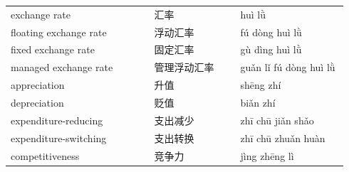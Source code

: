 \documentclass[11pt]{article}
\begin{document}
\begin{longtable}{@{}p{0.40\linewidth}p{0.24\linewidth}p{0.30\linewidth}@{}}
exchange rate & 汇率 & huì lǜ \\
floating exchange rate & 浮动汇率 & fú dòng huì lǜ \\
fixed exchange rate & 固定汇率 & gù dìng huì lǜ \\
managed exchange rate & 管理浮动汇率 & guǎn lǐ fú dòng huì lǜ \\
appreciation & 升值 & shēng zhí \\
depreciation & 贬值 & biǎn zhí \\
expenditure-reducing & 支出减少 & zhī chū jiǎn shǎo \\
expenditure-switching & 支出转换 & zhī chū zhuǎn huàn \\
competitiveness & 竞争力 & jìng zhēng lì \\
\end{longtable}
\end{document}
